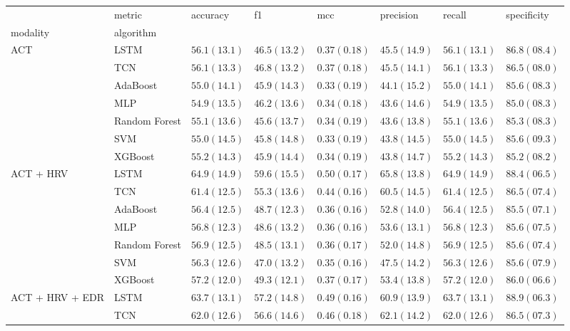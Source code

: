 \begin{tabular}{llllllll}
 & metric & accuracy & f1 & mcc & precision & recall & specificity \\
modality & algorithm &  &  &  &  &  &  \\
\multirow[c]{7}{*}{ACT} & LSTM & $56.1 (13.1)$ & $46.5 (13.2)$ & $0.37 (0.18)$ & $45.5 (14.9)$ & $56.1 (13.1)$ & $86.8 (08.4)$ \\
 & TCN & $56.1 (13.3)$ & $46.8 (13.2)$ & $0.37 (0.18)$ & $45.5 (14.1)$ & $56.1 (13.3)$ & $86.5 (08.0)$ \\
 & AdaBoost & $55.0 (14.1)$ & $45.9 (14.3)$ & $0.33 (0.19)$ & $44.1 (15.2)$ & $55.0 (14.1)$ & $85.6 (08.3)$ \\
 & MLP & $54.9 (13.5)$ & $46.2 (13.6)$ & $0.34 (0.18)$ & $43.6 (14.6)$ & $54.9 (13.5)$ & $85.0 (08.3)$ \\
 & Random Forest & $55.1 (13.6)$ & $45.6 (13.7)$ & $0.34 (0.19)$ & $43.6 (13.8)$ & $55.1 (13.6)$ & $85.3 (08.3)$ \\
 & SVM & $55.0 (14.5)$ & $45.8 (14.8)$ & $0.33 (0.19)$ & $43.8 (14.5)$ & $55.0 (14.5)$ & $85.6 (09.3)$ \\
 & XGBoost & $55.2 (14.3)$ & $45.9 (14.4)$ & $0.34 (0.19)$ & $43.8 (14.7)$ & $55.2 (14.3)$ & $85.2 (08.2)$ \\
\multirow[c]{7}{*}{ACT + HRV} & LSTM & $64.9 (14.9)$ & $59.6 (15.5)$ & $0.50 (0.17)$ & $65.8 (13.8)$ & $64.9 (14.9)$ & $88.4 (06.5)$ \\
 & TCN & $61.4 (12.5)$ & $55.3 (13.6)$ & $0.44 (0.16)$ & $60.5 (14.5)$ & $61.4 (12.5)$ & $86.5 (07.4)$ \\
 & AdaBoost & $56.4 (12.5)$ & $48.7 (12.3)$ & $0.36 (0.16)$ & $52.8 (14.0)$ & $56.4 (12.5)$ & $85.5 (07.1)$ \\
 & MLP & $56.8 (12.3)$ & $48.6 (13.2)$ & $0.36 (0.16)$ & $53.6 (13.1)$ & $56.8 (12.3)$ & $85.6 (07.5)$ \\
 & Random Forest & $56.9 (12.5)$ & $48.5 (13.1)$ & $0.36 (0.17)$ & $52.0 (14.8)$ & $56.9 (12.5)$ & $85.6 (07.4)$ \\
 & SVM & $56.3 (12.6)$ & $47.0 (13.2)$ & $0.35 (0.16)$ & $47.5 (14.2)$ & $56.3 (12.6)$ & $85.6 (07.9)$ \\
 & XGBoost & $57.2 (12.0)$ & $49.3 (12.1)$ & $0.37 (0.17)$ & $53.4 (13.8)$ & $57.2 (12.0)$ & $86.0 (06.6)$ \\
\multirow[c]{7}{*}{ACT + HRV + EDR} & LSTM & $63.7 (13.1)$ & $57.2 (14.8)$ & $0.49 (0.16)$ & $60.9 (13.9)$ & $63.7 (13.1)$ & $88.9 (06.3)$ \\
 & TCN & $62.0 (12.6)$ & $56.6 (14.6)$ & $0.46 (0.18)$ & $62.1 (14.2)$ & $62.0 (12.6)$ & $86.5 (07.3)$ \\

\end{tabular}
